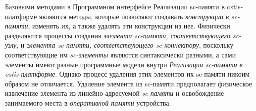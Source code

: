Базовыми методами в {Программном интерфейсе Реализации sc-памяти в ostis-платформе} являются методы, которые позволяют создавать \textit{конструкции в sc-памяти}, изменять их, а также удалять эти конструкции из нее. Физически разделяются процессы создания \textit{элемента sc-памяти, соответствующего sc-узлу}, и \textit{элемента sc-памяти, соответствующего sc-коннектору}, поскольку соответствующие им \textit{sc-элементы} являются синтаксически разными, а сами элементы имеют разные программные модели внутри \textit{Реализации sc-памяти в ostis-платформе}. Однако процесс удаления этих элементов их sc-памяти никоим образом не отличается. Удаление элемента из sc-памяти предполагает физическое извлечение элемента из линейно-адресуемой \textit{sc-памяти} и освобождение занимаемого места в \textit{оперативной памяти} устройства.

\begin{SCn}
\begin{scnsubstruct}
	

\end{scnsubstruct}
\end{SCn}

